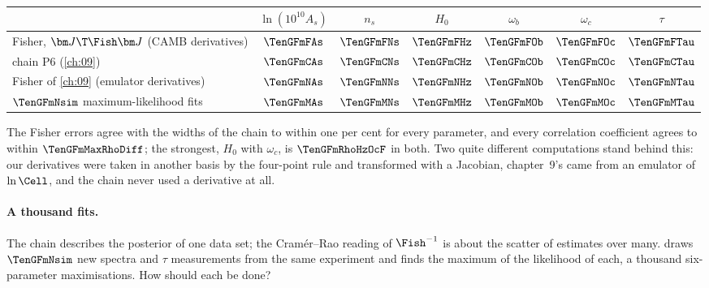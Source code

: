 \begin{center}
\small
\renewcommand{\arraystretch}{1.15}
\begin{tabular}{@{}lcccccc@{}}
\toprule
 & $\ln(10^{10}A_s)$ & $n_s$ & $H_0$ & $\omega_b$ & $\omega_c$ & $\tau$\\\midrule
Fisher, $\bm J\T\Fish\bm J$ (CAMB derivatives) & $\TenGFmFAs$ & $\TenGFmFNs$ & $\TenGFmFHz$ & $\TenGFmFOb$ & $\TenGFmFOc$ & $\TenGFmFTau$\\
chain P6 (\cref{ch:09}) & $\TenGFmCAs$ & $\TenGFmCNs$ & $\TenGFmCHz$ & $\TenGFmCOb$ & $\TenGFmCOc$ & $\TenGFmCTau$\\
Fisher of \cref{ch:09} (emulator derivatives) & $\TenGFmNAs$ & $\TenGFmNNs$ & $\TenGFmNHz$ & $\TenGFmNOb$ & $\TenGFmNOc$ & $\TenGFmNTau$\\
$\TenGFmNsim$ maximum-likelihood fits & $\TenGFmMAs$ & $\TenGFmMNs$ & $\TenGFmMHz$ & $\TenGFmMOb$ & $\TenGFmMOc$ & $\TenGFmMTau$\\
\bottomrule
\end{tabular}
\end{center}

The Fisher errors agree with the widths of the chain to within one per cent for every parameter, and every
correlation coefficient agrees to within $\TenGFmMaxRhoDiff$; the strongest, $H_0$ with $\omega_c$, is $\TenGFmRhoHzOcF$ in both. Two
quite different computations stand behind this: our derivatives were taken in another basis by the four-point
rule and transformed with a Jacobian, chapter~9's came from an emulator of $\ln\Cell$, and the chain never used a
derivative at all.

\paragraph{A thousand fits.} The chain describes the posterior of one data set; the Cram\'er--Rao reading of $\Fish^{-1}$
is about the scatter of estimates over many.  draws $\TenGFmNsim$ new spectra and $\tau$
measurements from the same experiment and finds the maximum of the likelihood of each, a thousand
six-parameter maximisations. How should each be done?

